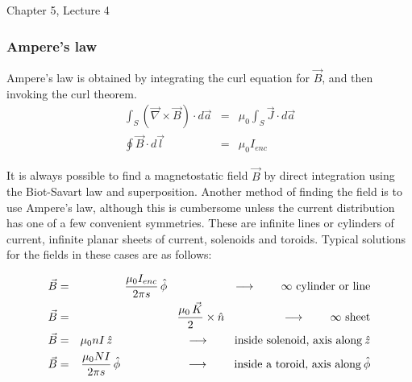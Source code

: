 \documentclass[12pt]{article}
\begin{document}
\begin{flushright} {\color{blue} Chapter 5, Lecture 4} \end{flushright}
\begin{flushleft}

\subsubsection*{\bf Ampere's law}

Ampere's law is obtained by integrating the curl equation for $\vec{B}$, and then invoking the curl theorem. 
\begin{eqnarray*}
\int_{S} (\vec{\nabla} \times \vec{B}) \cdot d\vec{a}  & =  & \mu_{0}\int_{S} \vec{J} \cdot d\vec{a}  \\ 
\oint \vec{B} \cdot d\vec{l}  & = & \mu_{0}I_{enc} 
\end{eqnarray*} 

It is always possible to find a magnetostatic field $\vec{B}$ by direct integration using the Biot-Savart law and superposition.  Another method of finding the field is to use Ampere's law, although this is cumbersome unless the current distribution has one of a few convenient symmetries.  These are infinite lines or cylinders of current, infinite planar sheets of current, solenoids and toroids.  Typical solutions for the fields in these cases are as follows:

\begin{eqnarray}
\vec{B}  & = & \frac{ \mu_{0}I_{enc} }{ 2 \pi  s} \, \hat{\phi} \hspace{.8in} \longrightarrow \hspace{.3in} \mbox{$\infty$ cylinder or line} \label{eq:line} \\
 \vec{B}  & = & \frac{ \mu_{0} \, \vec{K} }{2} \times \hat{n} \hspace{.7in} \longrightarrow \hspace{.3in} \mbox{$\infty$ sheet}  \label{eq:sheet_ampere}\\
 \vec{B}  & = & \mu_{0}nI \, \hat{z} \hspace{.9in} \longrightarrow \hspace{.3in} \mbox{inside solenoid, axis along} \: \hat{z} \label{eq:solenold} \\
 \vec{B}  & = & \frac{ \mu_{0}NI }{ 2 \pi  s} \, \hat{\phi} \hspace{.8in} \longrightarrow \hspace{.3in} \mbox{inside a toroid, axis along} \: \hat{\phi} \label{eq:toroid} 
\end{eqnarray}


\end{flushleft}
\end{document}

